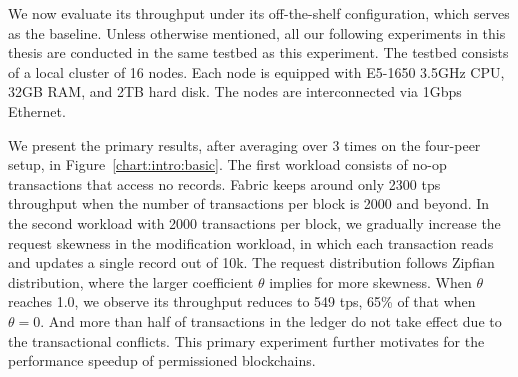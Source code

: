 We now evaluate its throughput under its off-the-shelf configuration, which serves as the baseline. 
Unless otherwise mentioned, all our following experiments in this thesis are conducted in the same testbed as this experiment.
The testbed consists of a local cluster of 16 nodes. Each node is equipped with E5-1650 3.5GHz CPU, 32GB RAM, and 2TB hard disk. The nodes are interconnected via 1Gbps Ethernet. 

We present the primary results, after averaging over 3 times on the four-peer setup, in Figure~\ref{chart:intro:basic}. 
The first workload consists of no-op transactions that access no records. 
Fabric keeps around only 2300 tps throughput when the number of transactions per block is 2000 and beyond. 
In the second workload with 2000 transactions per block, we gradually increase the request skewness in the modification workload, in which each transaction reads and updates a single record out of 10k. 
The request distribution follows Zipfian distribution, where the larger coefficient $\theta$ implies for more skewness. 
When $\theta$ reaches 1.0, we observe its throughput reduces to 549 tps, 65\% of that when $\theta=0$. 
And more than half of transactions in the ledger do not take effect due to the transactional conflicts. 
This primary experiment further motivates for the performance speedup of permissioned blockchains. 

